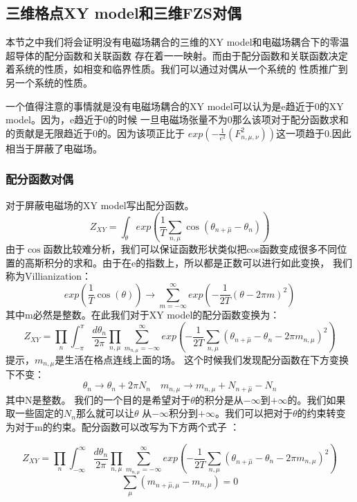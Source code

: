 \documentclass{article}
\begin{document}
\subsection{三维格点XY model和三维FZS对偶}
本节之中我们将会证明没有电磁场耦合的三维的XY model和电磁场耦合下的零温超导体的配分函数和关联函数
存在着一一映射。而由于配分函数和关联函数决定着系统的性质，如相变和临界性质。我们可以通过对偶从一个系统的
性质推广到另一个系统的性质。

一个值得注意的事情就是没有电磁场耦合的XY model可以认为是e趋近于0的XY model。因为，e趋近于0的时候
一旦电磁场张量不为0那么该项对于配分函数求和的贡献是无限趋近于0的。因为该项正比于
$exp(- \frac{1}{e^2}(F_{n,\mu,\nu}^2))$这一项趋于0.因此相当于屏蔽了电磁场。

\subsubsection{配分函数对偶}
对于屏蔽电磁场的XY model写出配分函数。
\begin{equation}
    Z_{XY} = \int_{\theta}  exp{ ( \frac{1}{T} \sum_{n,\mu} \cos(\theta_{n+ \hat \mu} - \theta_n)) }
\end{equation}
由于$\cos$函数比较难分析，我们可以保证函数形状类似把cos函数变成很多不同位置的高斯积分的求和。由于在e的指数上，所以都是正数可以进行如此变换，
我们称为Villianization：
\begin{equation}
    exp(\frac{1}{T} \cos(\theta)) \rightarrow  \sum_{m = - \infty}^{\infty} exp(- \frac{1}{2T} (\theta -2 \pi m)^2)
\end{equation}
其中m必然是整数。在此我们对于XY model的配分函数变换为：
\begin{equation}
    Z_{XY} = \prod_n \int_{- \pi}^{\pi} \frac{d \theta_n}{2 \pi} \prod_{n,\mu} \sum_{m_{n,\mu} = -\infty}^{\infty} exp ( - \frac{1}{2T} \sum_{n,\mu} (\theta_{n+ \hat \mu} - \theta_n - 2\pi m_{n,\mu})^2 )
\end{equation}
提示，$m_{n,\mu}$是生活在格点连线上面的场。
这个时候我们发现配分函数在下方变换下不变：
\begin{equation}
    \theta_n \rightarrow \theta_n + 2 \pi N_n \quad m_{n,\mu} \rightarrow m_{n,\mu} + N_{n+ \hat \mu} - N_n
\end{equation}
其中N是整数。
我们的一个目的是希望对于$\theta$的积分是从$- \infty$到$+ \infty$的。我们如果取一些固定的$N_n$那么就可以让$\theta$
从$- \infty$积分到$+ \infty$。我们可以把对于$\theta$的约束转变为对于m的约束。配分函数可以改写为下方两个式子
：

\begin{equation}
    Z_{XY} = \prod_n \int_{- \infty}^{\infty} \frac{d \theta_n}{2 \pi} \prod_{n,\mu} \sum_{m_{n,\mu} = -\infty}^{\infty} exp ( - \frac{1}{2T} \sum_{n,\mu} (\theta_{n+ \hat \mu} - \theta_n - 2\pi m_{n,\mu}) ^2)
\end{equation}
\begin{equation}
    \sum_{\mu} (m_{n+\hat \mu, \mu} - m_{n,\mu}) = 0
\end{equation}
\end{document}
